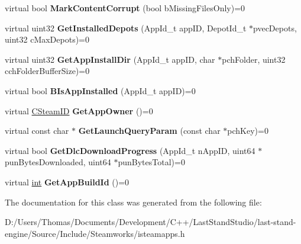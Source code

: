 \begin{DoxyCompactItemize}
\item 
\hypertarget{classISteamApps_ac9b871437aa6525bfc09913962fd4ac9}{}virtual bool {\bfseries Mark\+Content\+Corrupt} (bool b\+Missing\+Files\+Only)=0\label{classISteamApps_ac9b871437aa6525bfc09913962fd4ac9}

\item 
\hypertarget{classISteamApps_ad99e47bcc0d1901f9b48ceb9fa3e5817}{}virtual uint32 {\bfseries Get\+Installed\+Depots} (App\+Id\+\_\+t app\+I\+D, Depot\+Id\+\_\+t $\ast$pvec\+Depots, uint32 c\+Max\+Depots)=0\label{classISteamApps_ad99e47bcc0d1901f9b48ceb9fa3e5817}

\item 
\hypertarget{classISteamApps_a86c5be43cca3fa093e598eb57b42597f}{}virtual uint32 {\bfseries Get\+App\+Install\+Dir} (App\+Id\+\_\+t app\+I\+D, char $\ast$pch\+Folder, uint32 cch\+Folder\+Buffer\+Size)=0\label{classISteamApps_a86c5be43cca3fa093e598eb57b42597f}

\item 
\hypertarget{classISteamApps_afb81b0d67c2922fd2b873d9e5b5d14b3}{}virtual bool {\bfseries B\+Is\+App\+Installed} (App\+Id\+\_\+t app\+I\+D)=0\label{classISteamApps_afb81b0d67c2922fd2b873d9e5b5d14b3}

\item 
\hypertarget{classISteamApps_ae0a88dea59c107a672a6f094bd0d4918}{}virtual \hyperlink{classCSteamID}{C\+Steam\+I\+D} {\bfseries Get\+App\+Owner} ()=0\label{classISteamApps_ae0a88dea59c107a672a6f094bd0d4918}

\item 
\hypertarget{classISteamApps_a1059376db03a5a9770261c9f84673bab}{}virtual const char $\ast$ {\bfseries Get\+Launch\+Query\+Param} (const char $\ast$pch\+Key)=0\label{classISteamApps_a1059376db03a5a9770261c9f84673bab}

\item 
\hypertarget{classISteamApps_acc1761598473891e65deecd0d0ec504c}{}virtual bool {\bfseries Get\+Dlc\+Download\+Progress} (App\+Id\+\_\+t n\+App\+I\+D, uint64 $\ast$pun\+Bytes\+Downloaded, uint64 $\ast$pun\+Bytes\+Total)=0\label{classISteamApps_acc1761598473891e65deecd0d0ec504c}

\item 
\hypertarget{classISteamApps_a0216a1584a17fd771bddc64a453052b8}{}virtual \hyperlink{SDL__thread_8h_a6a64f9be4433e4de6e2f2f548cf3c08e}{int} {\bfseries Get\+App\+Build\+Id} ()=0\label{classISteamApps_a0216a1584a17fd771bddc64a453052b8}

\end{DoxyCompactItemize}


The documentation for this class was generated from the following file\+:\begin{DoxyCompactItemize}
\item 
D\+:/\+Users/\+Thomas/\+Documents/\+Development/\+C++/\+Last\+Stand\+Studio/last-\/stand-\/engine/\+Source/\+Include/\+Steamworks/isteamapps.\+h\end{DoxyCompactItemize}
